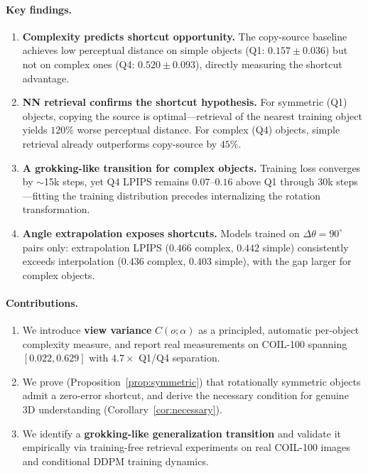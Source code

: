 \documentclass[11pt]{article}
\newcommand{\Dtheta}{\Delta\theta}
\begin{document}
\paragraph{Key findings.}
\begin{enumerate}[label=(\arabic*),nosep,topsep=2pt]
  \item \textbf{Complexity predicts shortcut opportunity.} The copy-source
    baseline achieves low perceptual distance on simple objects (Q1:
    $0.157 \pm 0.036$) but not on complex ones (Q4: $0.520 \pm 0.093$),
    directly measuring the shortcut advantage.
  \item \textbf{NN retrieval confirms the shortcut hypothesis.} For symmetric
    (Q1) objects, copying the source is optimal---retrieval of the nearest
    training object yields $120\%$ worse perceptual distance. For complex (Q4)
    objects, simple retrieval already outperforms copy-source by $45\%$.
  \item \textbf{A grokking-like transition for complex objects.} Training loss
    converges by $\sim$15k steps, yet Q4 LPIPS remains $0.07$--$0.16$ above Q1
    through 30k steps---fitting the training distribution precedes internalizing
    the rotation transformation.
  \item \textbf{Angle extrapolation exposes shortcuts.} Models trained on
    $\Dtheta = 90^{\circ}$ pairs only: extrapolation LPIPS
    ($0.466$ complex, $0.442$ simple) consistently exceeds interpolation
    ($0.436$ complex, $0.403$ simple), with the gap larger for complex objects.
\end{enumerate}

\paragraph{Contributions.}
\begin{enumerate}[label=(\arabic*),nosep,topsep=2pt]
  \item We introduce \textbf{view variance} $C(o;\alpha)$ as a principled,
    automatic per-object complexity measure, and report real measurements on
    COIL-100 spanning $[0.022, 0.629]$ with $4.7\times$ Q1/Q4 separation.
  \item We prove (Proposition~\ref{prop:symmetric}) that rotationally symmetric
    objects admit a zero-error shortcut, and derive the necessary condition for
    genuine 3D understanding (Corollary~\ref{cor:necessary}).
  \item We identify a \textbf{grokking-like generalization transition} and
    validate it empirically via training-free retrieval experiments on real
    COIL-100 images and conditional DDPM training dynamics.
\end{enumerate}
\end{document}
